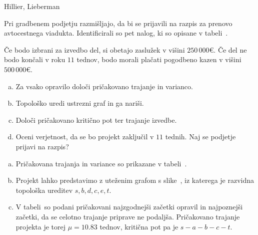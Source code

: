 \begin{naloga}{Hillier, Lieberman}{\cite[Problem~10.4-4]{hl}}
\begin{vprasanje}
Pri gradbenem podjetju razmišljajo,
da bi se prijavili na razpis za prenovo av\-to\-cest\-ne\-ga viadukta.
Identificirali so pet nalog, ki so opisane v tabeli~\tab.

Če bodo izbrani za izvedbo del, si obetajo zaslužek v višini $250\,000 €$.
Če del ne bodo končali v roku $11$ tednov,
bodo morali plačati pogodbeno kazen v višini $500\,000 €$.
\begin{enumerate}[(a)]
\item Za vsako opravilo določi pričakovano trajanje in varianco.
\item Topološko uredi ustrezni graf in ga nariši.
\item Določi pričakovano kritično pot ter trajanje izvedbe.
\item Oceni verjetnost, da se bo projekt zaključil v $11$ tednih.
Naj se podjetje prijavi na razpis?
\end{enumerate}

\begin{tabela}
\end{tabela}
\end{vprasanje}

\begin{odgovor}
\begin{enumerate}[(a)]
\item Pričakovana trajanja in variance
so prikazane v tabeli~.

\item Projekt lahko predstavimo z uteženim grafom s slike~\fig,
iz katerega je raz\-vid\-na topološka ureditev $s, b, d, c, e, t$.

\item V tabeli~
so podani pričakovani najzgodnejši začetki opravil in najpoznejši začetki,
da se celotno trajanje priprave ne podaljša.
Pričakovano trajanje projekta je torej $\mu = 10.83$ tednov,
kritična pot pa je $s - a - b - c - t$.


\end{enumerate}
\end{odgovor}
\end{naloga}
